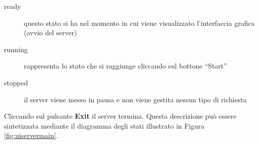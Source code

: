 \begin{description}
\item[ready] questo stato si ha nel momento in cui viene visualizzato
l'interfaccia grafica (avvio del server)

\item[running] rappresenta lo stato che si raggiunge cliccando
sul bottone {}``Start''

\item[stopped] il server viene messo in pausa e non viene gestita
nessun tipo di richiesta
\end{description}

Cliccando sul pulsante \textbf{Exit} il server termina. Questa descrizione può
essere sintetizzata mediante il diagramma degli stati illustrato in Figura
\vref{fig:uiservermain}.


